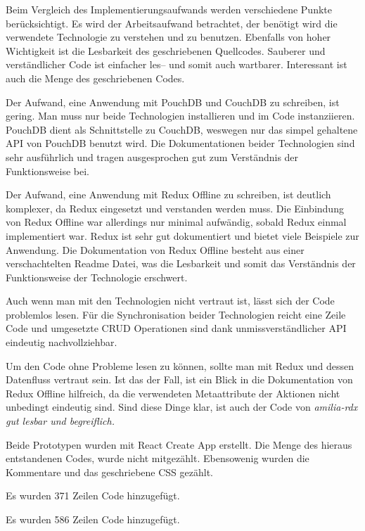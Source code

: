 Beim Vergleich des Implementierungsaufwands werden verschiedene Punkte berücksichtigt.
Es wird der Arbeitsaufwand betrachtet, der benötigt wird die verwendete Technologie zu verstehen und zu benutzen.
Ebenfalls von hoher Wichtigkeit ist die Lesbarkeit des geschriebenen Quellcodes.
Sauberer und verständlicher Code ist einfacher les-- und somit auch wartbarer. Interessant ist auch die Menge des geschriebenen Codes.
%
\begin{description}[leftmargin=0cm,style=nextline]
  \item[amilia-qouch]
  Der Aufwand, eine Anwendung mit PouchDB und CouchDB zu schreiben, ist gering.
  Man muss nur beide Technologien installieren und im Code instanziieren.
  PouchDB dient als Schnittstelle zu CouchDB, weswegen nur das simpel gehaltene \gls{API} von PouchDB benutzt wird.
  Die Dokumentationen beider Technologien sind sehr ausführlich und tragen ausgesprochen gut zum Verständnis der Funktionsweise bei.

  \item[amilia-rdx]
  Der Aufwand, eine Anwendung mit Redux Offline zu schreiben, ist deutlich komplexer, da Redux eingesetzt und verstanden werden muss.
  Die Einbindung von Redux Offline war allerdings nur minimal aufwändig, sobald Redux einmal implementiert war.
  Redux ist sehr gut dokumentiert und bietet viele Beispiele zur Anwendung.
  Die Dokumentation von Redux Offline besteht aus einer verschachtelten Readme Datei, was die Lesbarkeit und somit das Verständnis der Funktionsweise der Technologie erschwert.
\end{description}
%
\begin{description}[leftmargin=0cm,style=nextline]
  \item[amilia-qouch]
  Auch wenn man mit den Technologien nicht vertraut ist, lässt sich der Code problemlos lesen.
  Für die Synchronisation beider Technologien reicht eine Zeile Code und umgesetzte \gls{CRUD} Operationen sind dank unmissverständlicher API eindeutig nachvollziehbar.
  \item[amilia-rdx] 
  Um den Code ohne Probleme lesen zu können, sollte man mit Redux und dessen Datenfluss vertraut sein.
  Ist das der Fall, ist ein Blick in die Dokumentation von Redux Offline hilfreich, da die verwendeten Metaattribute der Aktionen nicht unbedingt eindeutig sind.
  Sind diese Dinge klar, ist auch der Code von \it{amilia-rdx} gut lesbar und begreiflich.
\end{description}
%
  Beide Prototypen wurden mit React Create App erstellt.
  Die Menge des hieraus entstandenen Codes, wurde nicht mitgezählt. Ebensowenig wurden die Kommentare und das geschriebene \gls{CSS} gezählt.
\begin{description}[leftmargin=0cm,style=nextline]
    \item[amilia-qouch]
    Es wurden 371 Zeilen Code hinzugefügt.
    \item[amilia-rdx] 
    Es wurden 586 Zeilen Code hinzugefügt.
\end{description}
